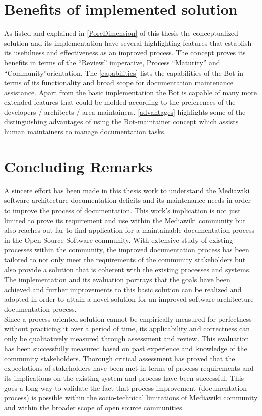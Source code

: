 \section{Benefits of implemented solution} 
\indent As listed and explained in \autoref{PorcDimension} of this thesis the conceptualized solution and its implementation have several highlighting features that establish its usefulness and effectiveness as an improved process. The concept proves its benefits in terms of the \enquote{Review} imperative, Process \enquote{Maturity} and \enquote{Community}orientation.
\newline \newline The \autoref{capabilities} lists the capabilities of the Bot in terms of its functionality and broad scope for documentation maintenance assistance. Apart from the basic implementation the Bot is capable of many more extended features that could be molded according to the preferences of the developers / architects / area maintainers. 	
\newline \newline \autoref{advantages} highlights some of the distinguishing advantages of using the Bot-maintainer concept which assists human maintainers to manage documentation tasks.

\section{Concluding Remarks} 	
\indent A sincere effort has been made in this thesis work to understand the Mediawiki software architecture documentation deficits and its maintenance needs in order to improve the process of documentation. This work's implication is not just limited to prove its requirement and use within the Mediawiki community but also reaches out far to find application for a maintainable documentation process in the Open Source Software community. With extensive study of existing processes within the community, the improved documentation process has been tailored to not only meet the requirements of the community stakeholders but also provide a solution that is coherent with the existing processes and systems. The implementation and its evaluation portrays that the goals have been achieved and further improvements to this basic solution can be realized and adopted in order to attain a novel solution for an improved software architecture documentation process. 
\\\indent Since a process-oriented solution cannot be empirically measured for perfectness without practicing it over a period of time, its applicability and correctness can only be qualitatively measured through assessment and review. This evaluation has been successfully measured based on past experience and knowledge of the community stakeholders. Thorough critical assessment has proved that the expectations of stakeholders have been met in terms of process requirements and its implications on the existing system and process have been successful. This goes a long way to validate the fact that process improvement (documentation process) is possible within the socio-technical limitations of Mediawiki community and within the broader scope of open source communities.
